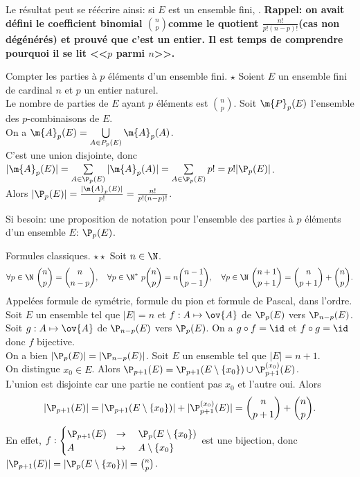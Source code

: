 \documentclass[11pt]{article}
\begin{document}
Le résultat peut se réécrire ainsi: si $E$ est un ensemble fini, .\n
\bf{Rappel:} on avait défini le coefficient binomial \Large$\binom{n}{p}$\normalsize comme le quotient \Large$\frac{n!}{p!(n-p)!}$\normalsize (cas non dégénérés) et prouvé que c'est un entier. Il est temps de comprendre pourquoi il se lit <<$p$ parmi $n$>>.

\begin{prop}{Compter les parties à $p$ éléments d'un ensemble fini. $\star$}{}
    Soient $E$ un ensemble fini de cardinal $n$ et $p$ un entier naturel.\\
    Le nombre de parties de $E$ ayant $p$ éléments est \Large$\binom{n}{p}$.
    \tcblower
    Soit $\m{P}_p(E)$ l'ensemble des $p$-combinaisons de $E$.\\
    On a $\m{A}_p(E)=\bigcup\limits_{A\in P_p(E)}\m{A}_p(A)$.\\
    C'est une union disjointe, donc $|\m{A}_p(E)|=\sum\limits_{A\in\P_p(E)}|\m{A}_p(A)|=\sum\limits_{A\in\P_p(E)}p!=p!|\P_p(E)|$.\\
    Alors $|\P_p(E)|=\frac{|\m{A}_p(E)|}{p!}=\frac{n!}{p!(n-p)!}$.
\end{prop}
Si besoin: une proposition de notation pour l'ensemble des parties à $p$ éléments d'un ensemble $E$: $\P_p(E)$.

\pagebreak
\begin{prop}{Formules classiques. $\star\star$}{}
    Soit $n\in\N$.
    \begin{equation*}
        \forall p\in\N~\binom{n}{p}=\binom{n}{n-p},\quad\forall p\in\N^*~p\binom{n}{p}=n\binom{n-1}{p-1},\quad\forall p\in\N~\binom{n+1}{p+1}=\binom{n}{p+1}+\binom{n}{p}.
    \end{equation*}
    Appelées formule de symétrie, formule du pion et formule de Pascal, dans l'ordre.
    \tcblower
     Soit $E$ un ensemble tel que $|E|=n$ et $f:A\mapsto\ov{A}$ de $\P_p(E)$ vers $\P_{n-p}(E)$.\\
    Soit $g:A\mapsto\ov{A}$ de $\P_{n-p}(E)$ vers $\P_p(E)$. On a $g\circ f=\id$ et $f\circ g=\id$ donc $f$ bijective.\\
    On a bien $|\P_p(E)|=|\P_{n-p}(E)|$.\n
     Soit $E$ un ensemble tel que $|E|=n+1$.\\
    On distingue $x_0\in E$. Alors $\P_{p+1}(E)=\P_{p+1}(E\setminus\{x_0\})\cup\P^{(x_0)}_{p+1}(E)$.\\
    L'union est disjointe car une partie ne contient pas $x_0$ et l'autre oui. Alors
    \begin{equation*}
        |\P_{p+1}(E)|=|\P_{p+1}(E\setminus\{x_0\})|+|\P_{p+1}^{(x_0)}(E)|=\binom{n}{p+1}+\binom{n}{p}.
    \end{equation*}
    En effet, $f:\begin{cases}
        \P_{p+1}(E)&\to\quad\P_{p}(E\setminus\{x_0\})\\
        A&\mapsto\quad A\setminus\{x_0\}
    \end{cases}$
    est une bijection, donc $|\P_{p+1}(E)|=|\P_{p}(E\setminus\{x_0\})|=\binom{n}{p}$.
\end{prop}
\end{document}
